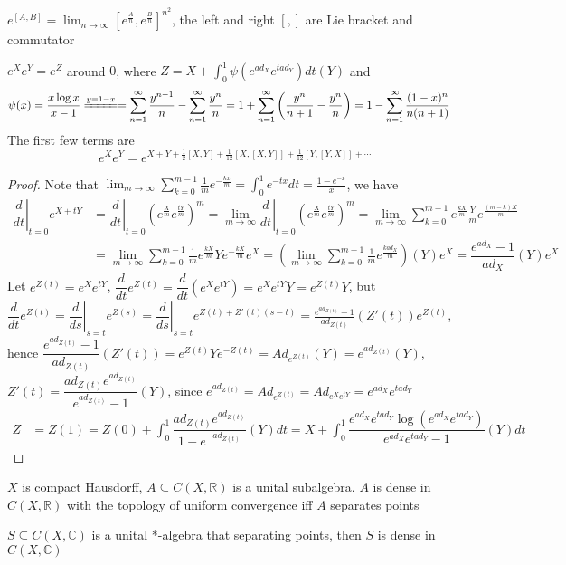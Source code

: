 \documentclass[main]{subfiles}
\begin{document}
\begin{theorem}\label{Lie commutator formula}
$\displaystyle e^{[A,B]}=\lim_{n\to\infty}\left[e^{\frac{A}{n}},e^{\frac{B}{n}}\right]^{n^2}$, the left and right $[,]$ are Lie bracket and commutator
\end{theorem}

\begin{theorem}
$e^Xe^Y=e^Z$ around $0$, where $\displaystyle Z=X+\int_0^1\psi(e^{ad_X}e^{tad_Y})dt(Y)$ and
\begin{align*}
\psi(x)&=\frac{x\log x}{x-1}\xequal{y=1-x}=\sum_{n=1}^\infty\frac{y^{n-1}}{n}-\sum_{n=1}^\infty\frac{y^n}{n}=1+\sum_{n=1}^\infty\left(\frac{y^n}{n+1}-\frac{y^n}{n}\right)=1-\sum_{n=1}^\infty\frac{(1-x)^n}{n(n+1)}
\end{align*}
The first few terms are
\[e^Xe^Y=e^{X+Y+\frac{1}{2}[X,Y]+\frac{1}{12}[X,[X,Y]]+\frac{1}{12}[Y,[Y,X]]+\cdots}\]
\end{theorem}

\begin{proof}
Note that $\displaystyle\lim_{m\to\infty}\sum_{k=0}^{m-1}\frac{1}{m}e^{-\frac{kx}{m}}=\int_0^1e^{-tx}dt=\frac{1-e^{-x}}{x}$, we have
\begin{align*}
\left.\dfrac{d}{dt}\right|_{t=0}e^{X+tY}&=\left.\dfrac{d}{dt}\right|_{t=0}\left(e^\frac{X}{m}e^\frac{tY}{m}\right)^m =\lim_{m\to\infty}\left.\dfrac{d}{dt}\right|_{t=0}\left(e^\frac{X}{m}e^\frac{tY}{m}\right)^m=\lim_{m\to\infty}\sum_{k=0}^{m-1}e^\frac{kX}{m}\textstyle\frac{Y}{m}e^\frac{(m-k)X}{m} \\
&=\lim_{m\to\infty}\sum_{k=0}^{m-1}\frac{1}{m}e^\frac{kX}{m}Ye^{-\frac{kX}{m}}e^X=\left(\lim_{m\to\infty}\sum_{k=0}^{m-1}\frac{1}{m}e^{\frac{kad_X}{m}}\right)(Y)e^X=\dfrac{e^{ad_X}-1}{ad_X}(Y)e^X
\end{align*}
Let $e^{Z(t)}=e^Xe^{tY}$, $\dfrac{d}{dt}e^{Z(t)}=\dfrac{d}{dt}(e^Xe^{tY})=e^Xe^{tY}Y=e^{Z(t)}Y$, but $\displaystyle\dfrac{d}{dt}e^{Z(t)}=\left.\dfrac{d}{ds}\right|_{s=t}e^{Z(s)}=\left.\dfrac{d}{ds}\right|_{s=t}e^{Z(t)+Z'(t)(s-t)}=\frac{e^{ad_{Z(t)}}-1}{ad_{Z(t)}}(Z'(t))e^{Z(t)}$, hence $\dfrac{e^{ad_{Z(t)}}-1}{ad_{Z(t)}}(Z'(t))=e^{Z(t)}Ye^{-Z(t)}=Ad_{e^{Z(t)}}(Y)=e^{ad_{Z(t)}}(Y)$, $Z'(t)=\dfrac{ad_{Z(t)}e^{ad_{Z(t)}}}{e^{ad_{Z(t)}}-1}(Y)$, since $e^{ad_{Z(t)}}=Ad_{e^{Z(t)}}=Ad_{e^Xe^{tY}}=e^{ad_X}e^{tad_Y}$
\begin{align*}
Z&=Z(1)=Z(0)+\int_0^1\dfrac{ad_{Z(t)}e^{ad_{Z(t)}}}{1-e^{-ad_{Z(t)}}}(Y)dt=X+\int_0^1\dfrac{e^{ad_X}e^{tad_Y}\log(e^{ad_X}e^{tad_Y})}{e^{ad_X}e^{tad_Y}-1}(Y)dt
\end{align*}
\end{proof}

\begin{theorem}
$X$ is compact Hausdorff, $A\subseteq C(X,\mathbb R)$ is a unital subalgebra. $A$ is dense in $C(X,\mathbb R)$ with the topology of uniform convergence iff $A$ separates points \par
$S\subseteq C(X,\mathbb C)$ is a unital *-algebra that separating points, then $S$ is dense in $C(X,\mathbb C)$
\end{theorem}
\end{document}
